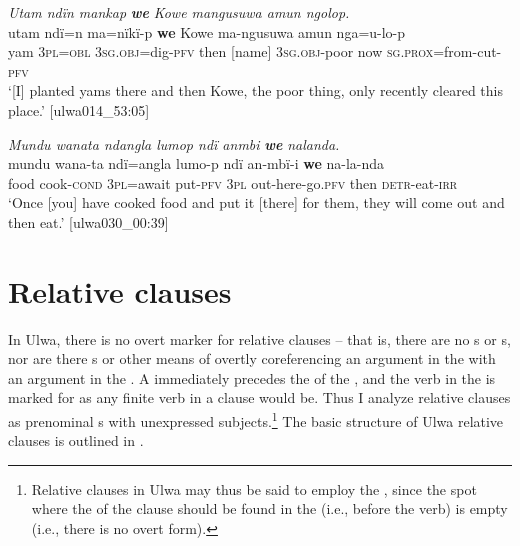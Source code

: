 
\newpage

\ea%
    \label{ex:complex:79}
          \textit{Utam ndïn mankap} \textbf{\textit{we}} \textit{Kowe mangusuwa amun ngolop.}\\
\gll    utam  ndï=n  ma=nïkï-p        \textbf{we}    Kowe  ma-ngusuwa amun  nga=u-lo-p\\
    yam  3\textsc{pl=obl}  3\textsc{sg.obj}=dig-\textsc{pfv}  then  [name]  3\textsc{sg.obj-}poor    now  \textsc{sg.prox}=from-cut-\textsc{pfv}\\
\glt `[I] planted yams there and then Kowe, the poor thing, only recently cleared this place.’ [ulwa014\_53:05]
\z

\ea%
    \label{ex:complex:80}
          \textit{Mundu wanata ndangla lumop ndï anmbi} \textbf{\textit{we}} \textit{nalanda.}\\
\gll    mundu  wana-ta    ndï=angla  lumo-p    ndï  an-mbï-i     \textbf{we}    na-la-nda\\
    food  cook-\textsc{cond}  3\textsc{pl}=await  put-\textsc{pfv}  \textsc{3pl}  out-here-go.\textsc{pfv}    then  \textsc{detr-}eat-\textsc{irr}\\
\glt `Once [you] have cooked food and put it [there] for them, they will come out and then eat.’ [ulwa030\_00:39]
\z

\section{Relative clauses}\label{sec:12.3}


 In Ulwa, there is no overt  marker for relative clauses -- that is, there are no s or s, nor are there s or other means of overtly coreferencing an argument in the  with an argument in the . A  immediately precedes the  of the , and the verb in the  is marked for  as any finite verb in a clause would be. Thus I analyze relative clauses as prenominal s with unexpressed subjects.\footnote{Relative clauses in Ulwa may thus be said to employ the , since the  spot where the  of the  clause should be found in the  (i.e., before the verb) is empty (i.e., there is no overt  form).} The basic structure of Ulwa relative clauses is outlined in .

